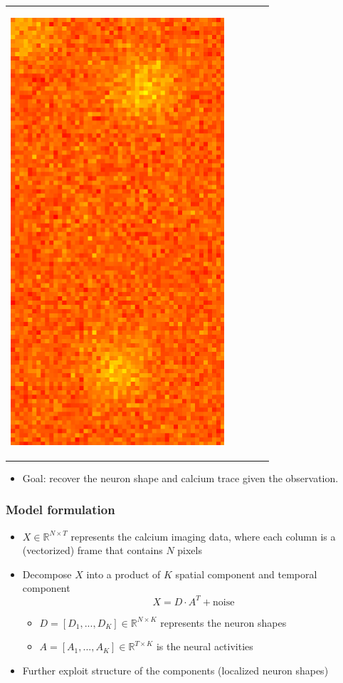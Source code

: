 \documentclass[16pt,presentation]{beamer}
\begin{document}
\begin{frame}
\begin{tabular}[t]{ccccc}
\begin{minipage}{0.06\textwidth}
\begin{center}
 \includegraphics[scale=0.2,clip = true]{figs/ROI_cartoon/fig_cartoon_frame_297.pdf}
  \end{center}
 \end{minipage}
\end{tabular}
\begin{itemize}
\item \alert{Goal}: recover the neuron shape and calcium trace given the observation.
\end{itemize}

\end{frame}

\begin{frame}
\frametitle{Model formulation}
\begin{itemize}
\item  $X \in \mathbb{R}^{N \times T}$ represents the calcium imaging data, where each column is a (vectorized) frame that contains $N$ pixels
\item Decompose $X$ into a product of $K$ \alert{spatial component} and \alert{temporal component}%
\[X = D \cdot A^T + \text{noise}\]
\begin{itemize}
\item $D = [D_1,...,D_K] \in \mathbb{R}^{N \times K}$ represents the neuron shapes
\item $A = [A_1,...,A_K] \in \mathbb{R}^{T \times K}$ is the neural activities%
\end{itemize}
\item Further exploit structure of the components (localized neuron shapes)
\end{itemize}
\end{frame}
\end{document}
